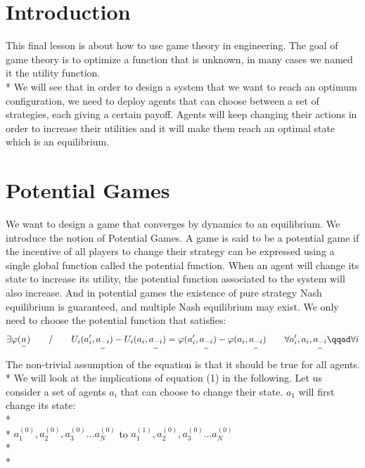 \section{Introduction}
This final lesson is about how to use game theory in engineering. The goal of game theory is to optimize a function that is unknown, in many cases we named it the utility function.\\*
We will see that in order to design a system that we want to reach an optimum configuration, we need to deploy agents that can choose between a set of strategies, each giving a certain payoff. Agents will keep changing their actions in order to increase their utilities and it will make them reach an optimal state which is an equilibrium. 
\section{Potential Games}
We want to design a game that converges by dynamics to an equilibrium. We introduce the notion of Potential Games. A game is said to be a potential game if the incentive of all players to change their strategy can be expressed using a single global function called the potential function. When an agent will change its state to increase its utility, the potential function associated to the system will also increase. And in potential games the existence of pure strategy Nash equilibrium is guaranteed, and multiple Nash equilibrium may exist. We only need to choose the potential function that satisfies: 
\begin{equation}
\exists \varphi(\underset{-}{a}) \qquad / \qquad  U_i(a'_i,\underset{-}{a_{-i}})-U_i(a_i,\underset{-}{a_{-i}})=\varphi(a'_i,\underset{-}{a_{-i}})-\varphi(a_i,\underset{-}{a_{-i}}) \qquad \forall a'_i,a_i, \underset{-}{a_{-i}}  \qqad \forall i
\end{equation}
The non-trivial assumption of the equation is that it should be true for all agents.\\*
We will look at the implications of equation (1) in the following. Let us consider a set of agents $a_i $ that can choose to change their state. $a_1 $ will first change its state: \\*
\\*
\hspace*{20pt} $a_1^{(0)},a_2^{(0)},a_3^{(0)}...a_N^{(0)}$ \hspace*{15pt} to \hspace*{15pt} $a_1^{(1)},a_2^{(0)},a_3^{(0)}...a_N^{(0)}$ \\* \\*
